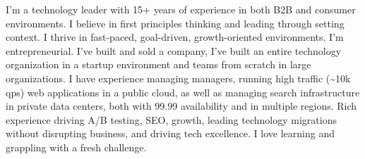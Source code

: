\documentclass[11pt,a4paper,roman]{moderncv}       %
\begin{document}
\makecvtitle

\small{I'm a technology leader with 15+ years of experience in both B2B and consumer environments. 
I believe in first principles thinking and leading through setting context.
I thrive in fast-paced, goal-driven, growth-oriented environments. 
I'm entrepreneurial. 
I've built and sold a company, I've built an entire technology organization in a startup environment and teams from scratch in large organizations.
I have experience managing managers, running high traffic (\textasciitilde10k qps) web applications in a public cloud, as well as managing search infrastructure in private data centers, both with 99.99 availability and in multiple regions.
Rich experience driving A/B testing, SEO, growth, leading technology migrations without disrupting business, and driving tech excellence.
I love learning and grappling with a fresh challenge.
}

\bigskip
\end{document}
